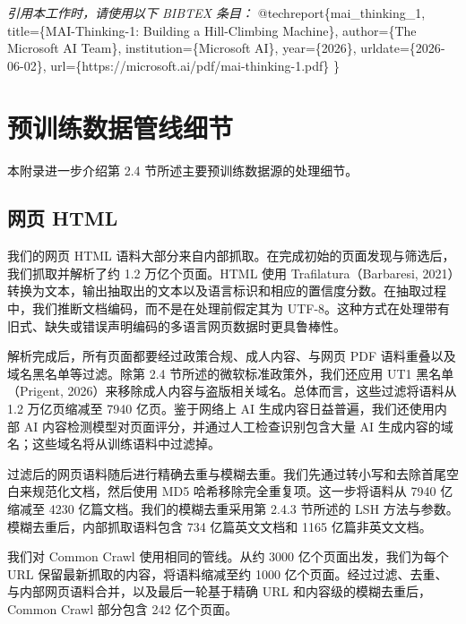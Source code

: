 \documentclass[
  10
]{article}
\newenvironment{Shaded}{}{}
\newcommand{\CommentTok}[1]{\textcolor[rgb]{0.38,0.63,0.69}{\textit{#1}}}
\newcommand{\DataTypeTok}[1]{\textcolor[rgb]{0.56,0.13,0.00}{#1}}
\newcommand{\NormalTok}[1]{#1}
\newcommand{\OtherTok}[1]{\textcolor[rgb]{0.00,0.44,0.13}{#1}}
\newcommand{\VariableTok}[1]{\textcolor[rgb]{0.10,0.09,0.49}{#1}}
\begin{document}
\begin{Shaded}
\begin{Highlighting}[]
\CommentTok{引用本工作时，请使用以下 BIBTEX 条目：}
\VariableTok{@techreport}\NormalTok{\{}\OtherTok{mai\_thinking\_1}\NormalTok{,}
\DataTypeTok{title}\NormalTok{=\{MAI{-}Thinking{-}1: Building a Hill{-}Climbing Machine\},}
\DataTypeTok{author}\NormalTok{=\{The Microsoft AI Team\},}
\DataTypeTok{institution}\NormalTok{=\{Microsoft AI\},}
\DataTypeTok{year}\NormalTok{=\{2026\},}
\DataTypeTok{urldate}\NormalTok{=\{2026{-}06{-}02\},}
\DataTypeTok{url}\NormalTok{=\{https://microsoft.ai/pdf/mai{-}thinking{-}1.pdf\}}
\NormalTok{\}}
\end{Highlighting}
\end{Shaded}

\section{预训练数据管线细节}\label{b-pretraining-data-pipeline-details}

本附录进一步介绍第 2.4 节所述主要预训练数据源的处理细节。

\subsection{网页 HTML}\label{b.1-web-html}

我们的网页 HTML 语料大部分来自内部抓取。在完成初始的页面发现与筛选后，我们抓取并解析了约 1.2 万亿个页面。HTML 使用 Trafilatura（Barbaresi, 2021）转换为文本，输出抽取出的文本以及语言标识和相应的置信度分数。在抽取过程中，我们推断文档编码，而不是在处理前假定其为 UTF-8。这种方式在处理带有旧式、缺失或错误声明编码的多语言网页数据时更具鲁棒性。

解析完成后，所有页面都要经过政策合规、成人内容、与网页 PDF 语料重叠以及域名黑名单等过滤。除第 2.4 节所述的微软标准政策外，我们还应用 UT1 黑名单（Prigent, 2026）来移除成人内容与盗版相关域名。总体而言，这些过滤将语料从 1.2 万亿页缩减至 7940 亿页。鉴于网络上 AI 生成内容日益普遍，我们还使用内部 AI 内容检测模型对页面评分，并通过人工检查识别包含大量 AI 生成内容的域名；这些域名将从训练语料中过滤掉。

过滤后的网页语料随后进行精确去重与模糊去重。我们先通过转小写和去除首尾空白来规范化文档，然后使用 MD5 哈希移除完全重复项。这一步将语料从 7940 亿缩减至 4230 亿篇文档。我们的模糊去重采用第 2.4.3 节所述的 LSH 方法与参数。模糊去重后，内部抓取语料包含 734 亿篇英文文档和 1165 亿篇非英文文档。

我们对 Common Crawl 使用相同的管线。从约 3000 亿个页面出发，我们为每个 URL 保留最新抓取的内容，将语料缩减至约 1000 亿个页面。经过过滤、去重、与内部网页语料合并，以及最后一轮基于精确 URL 和内容级的模糊去重后，Common Crawl 部分包含 242 亿个页面。
\end{document}
